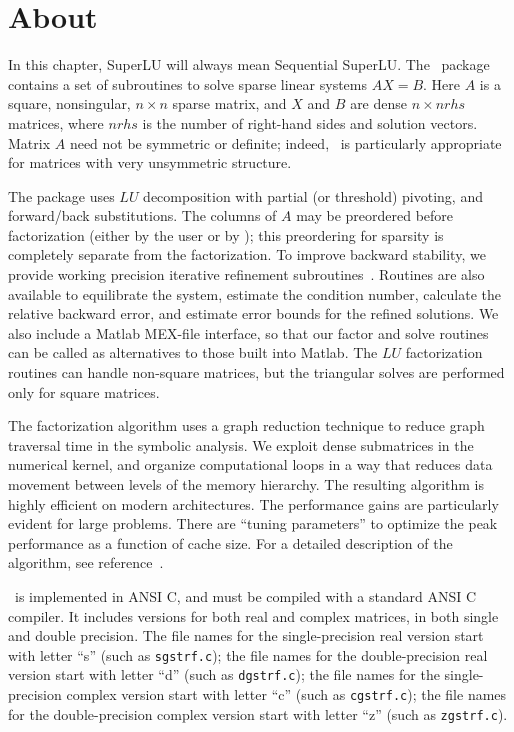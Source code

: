 
\section{{About \SuperLU}}

In this chapter, SuperLU will always mean Sequential SuperLU.
The \SuperLU\ package contains a set of subroutines to solve sparse 
linear systems $AX=B$. Here $A$ is a square, nonsingular, $n\times n$
sparse matrix, and  
$X$ and $B$ are dense $n\times nrhs$ matrices, where 
$nrhs$ is the number of right-hand sides and solution vectors.
Matrix $A$ need not be symmetric or definite; indeed, \SuperLU\ is
particularly appropriate for matrices with very unsymmetric structure.

The package uses $LU$ decomposition with partial (or threshold) pivoting,
and forward/back substitutions. The columns of $A$ may be preordered before 
factorization (either by the user or by \SuperLU); 
this preordering for sparsity is completely separate from 
the factorization. To improve backward stability, we provide working 
precision iterative refinement subroutines~\cite{arioli89}. 
Routines are also available to 
equilibrate the system, estimate the condition number, calculate 
the relative backward error, and estimate error bounds for the 
refined solutions. We also include a Matlab MEX-file interface, so that
our factor and solve routines can be called as alternatives to those 
built into Matlab. The $LU$ factorization routines can handle
non-square matrices, but the triangular solves are performed only
for square matrices.

    The factorization algorithm uses a graph reduction technique to 
reduce graph traversal time in the symbolic analysis. We exploit
dense submatrices in the numerical kernel, and organize computational
loops in a way that reduces data movement between levels of the
memory hierarchy.
The resulting algorithm is highly efficient on modern architectures.
The performance gains are particularly evident for large problems.
There are ``tuning parameters'' to optimize the peak performance as
a function of cache size. For a detailed description of the algorithm,
see reference~\cite{superlu99}.

    \SuperLU\ is implemented in ANSI C, and must be compiled with a standard
ANSI C compiler. It includes versions for both real and complex
matrices, in both single and double precision. 
The file names for the 
single-precision real version start with letter ``s'' (such as {\tt sgstrf.c});
the file names for the double-precision real version start with letter ``d'' 
(such as {\tt dgstrf.c}); the file names for the single-precision complex
version start with letter ``c'' (such as {\tt cgstrf.c}); the file names
for the double-precision complex version start with letter ``z'' 
(such as {\tt zgstrf.c}).

